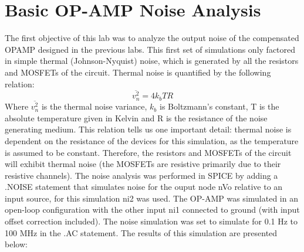\documentclass[12pt]{article}
\begin{document}
\section{Basic OP-AMP Noise Analysis}
The first objective of this lab was to analyze the output noise of the compensated OPAMP designed in the previous labs. This first set of simulations only factored in simple thermal (Johnson-Nyquist) noise, which is generated by all the resistors and MOSFETs of the circuit. Thermal noise is quantified by the following relation:
\begin{equation}
\overline{v_n^2} = 4k_bTR
\end{equation}
Where $\overline{v_n^2}$ is the thermal noise variance, $k_b$ is Boltzmann's constant, T is the absolute temperature given in Kelvin and R is the resistance of the noise generating medium. This relation tells us one important detail: thermal noise is dependent on the resistance of the devices for this simulation, as the temperature is assumed to be constant. Therefore, the resistors and MOSFETs of the circuit will exhibit thermal noise (the MOSFETs are resistive primarily due to their resistive channels). The noise analysis was performed in SPICE by adding a .NOISE statement that simulates noise for the ouput node nVo relative to an input source, for this simulation ni2 was used. The OP-AMP was simulated in an open-loop configuration with the other input ni1 connected to ground (with input offset correction included). The noise simulation was set to simulate for 0.1 Hz to 100 MHz in the .AC statement. The results of this simulation are presented below:
\end{document}
